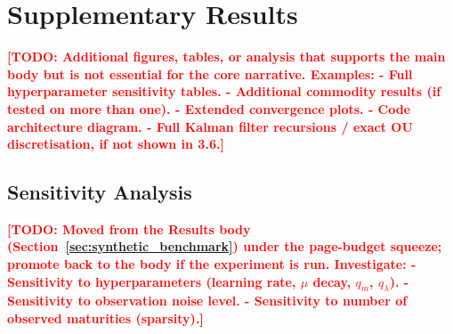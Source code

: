 \documentclass[11pt, a4paper]{article}
\newcommand{\todo}[1]{\textcolor{red}{\textbf{[TODO: #1]}}}
\begin{document}
\section{Supplementary Results}
\label{app:supplementary}

\todo{Additional figures, tables, or analysis that supports the main body
but is not essential for the core narrative. Examples:
  - Full hyperparameter sensitivity tables.
  - Additional commodity results (if tested on more than one).
  - Extended convergence plots.
  - Code architecture diagram.
  - Full Kalman filter recursions / exact OU discretisation, if not shown in 3.6.}

\subsection{Sensitivity Analysis}
\label{sec:sensitivity}

\todo{Moved from the Results body (Section~\ref{sec:synthetic_benchmark}) under
  the page-budget squeeze; promote back to the body if the experiment is run.
  Investigate:
  - Sensitivity to hyperparameters (learning rate, $\mu$ decay, $q_m$, $q_\lambda$).
  - Sensitivity to observation noise level.
  - Sensitivity to number of observed maturities (sparsity).}
\end{document}
